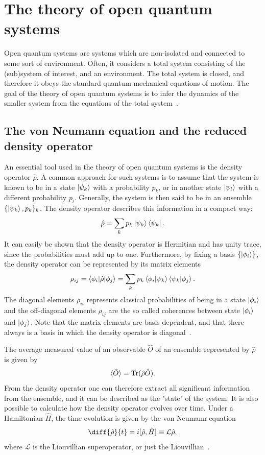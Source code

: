 \documentclass[../main.tex]{subfiles}
\begin{document}
\section{The theory of open quantum systems}
Open quantum systems are systems which are non-isolated and connected to some sort of environment. Often, it considers a total system consisting of the (sub)system of interest, and an environment. The total system is closed, and therefore it obeys the standard quantum mechanical equations of motion. The goal of the theory of open quantum systems is to infer the dynamics of the smaller system from the equations of the total system~\cite{lindblad}.

\subsection{The von Neumann equation and the reduced density operator}

An essential tool used in the theory of open quantum systems is the density operator $\hat{\rho}$. A common approach for such systems is to assume that the system is known to be in a state $\ket{\psi_k}$ with a probability $p_k$, or in another state $\ket{\psi_l}$ with a different probability $p_l$. Generally, the system is then said to be in an ensemble $\{\ket{\psi_k}, p_k\}_k$. The density operator describes this information in a compact way:
\begin{equation}
    \hat{\rho} = \sum_k p_k \ket{\psi_k}\bra{\psi_k}.
\end{equation}
It can easily be shown that the density operator is Hermitian and has unity trace, since the probabilities must add up to one. Furthermore, by fixing a basis $\{\ket{\phi_i}\}$, the density operator can be represented by its matrix elements 
\begin{equation}
    \rho_{ij} = \braket{\phi_i|\hat\rho|\phi_j} = \sum_k p_k \braket{\phi_i|\psi_k}\braket{\psi_k|\phi_j}.
\end{equation}
The diagonal elements $\rho_{ii}$ represents classical probabilities of being in a state $\ket{\phi_i}$ and the off-diagonal elements $\rho_{ij}$ are the so called coherences between state $\ket{\phi_i}$ and $\ket{\phi_j}$. Note that the matrix elements are basis dependent, and that there always is a basis in which the density operator is diagonal~\cite{bookopen}.

The average measured value of an observable $\hat O$ of an ensemble represented by $\hat\rho$ is given by
\begin{equation}\label{eq:expec}
    \braket{\hat O} = \operatorname{Tr}({\hat\rho \hat O}).
\end{equation}
From the density operator one can therefore extract all significant information from the ensemble, and it can be described as the "state" of the system. It is also possible to calculate how the density operator evolves over time. Under a Hamiltonian $\hat H$, the time evolution is given by the von Neumann equation
\begin{equation}\label{vonneumann}
    \diff{\hat\rho}{t} = i[\hat \rho, \hat H] \equiv \mathcal{L}\hat\rho,
\end{equation}
where $\mathcal{L}$ is the Liouvillian superoperator, or just the Liouvillian~\cite{bookopen}. 
\end{document}
